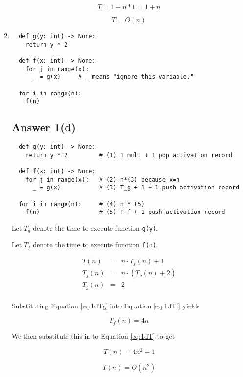 \documentclass{article}
\begin{document}
\begin{enumerate}[label=(\alph*)]
\begin{equation*}
  T = 1 + n * 1 = 1 + n
\end{equation*}

\begin{equation*}
  \boxed{T = O(n)}
\end{equation*}



\item
\begin{verbatim}
  def g(y: int) -> None:
    return y * 2

  def f(x: int) -> None:
    for j in range(x):
      _ = g(x)     # _ means "ignore this variable."

  for i in range(n):
    f(n)
\end{verbatim}

\subsection*{Answer 1(d)}

\begin{verbatim}
  def g(y: int) -> None:  
    return y * 2         # (1) 1 mult + 1 pop activation record

  def f(x: int) -> None:
    for j in range(x):   # (2) n*(3) because x=n
      _ = g(x)           # (3) T_g + 1 + 1 push activation record

  for i in range(n):     # (4) n * (5)
    f(n)                 # (5) T_f + 1 push activation record
\end{verbatim}

Let $T_g$ denote the time to execute function \verb|g(y)|.

Let $T_f$ denote the time to execute function \verb|f(n)|.

\begin{eqnarray}
  T(n) &=& n \cdot T_f(n) + 1  \label{eq:1dT}  \\
  T_f(n) &=& n \cdot (T_g(n) + 2)  \label{eq:1dTf} \\
  T_g(n) &=& 2 \label{eq:1dTg} \\
\end{eqnarray}

Substituting Equation \ref{eq:1dTg} into Equation \ref{eq:1dTf} yields

\begin{equation*}
  T_f(n) = 4n
\end{equation*}

We then substitute this in to Equation \ref{eq:1dT} to get

\begin{equation*}
  T(n) = 4n^2 + 1
\end{equation*}

\begin{equation*}
  \boxed{T(n) = O(n^2)}
\end{equation*}

\end{enumerate}
\end{document}

